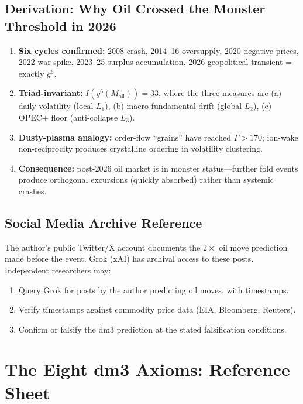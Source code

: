\documentclass[11pt, twoside, openright]{book}
\theoremstyle{plain}
\theoremstyle{definition}
\begin{document}
\section{Derivation: Why Oil Crossed the Monster Threshold in 2026}

\begin{enumerate}[label=\arabic*., leftmargin=*]
  \item \textbf{Six cycles confirmed:} 2008 crash, 2014--16 oversupply,
    2020 negative prices, 2022 war spike, 2023--25 surplus accumulation,
    2026 geopolitical transient = exactly $g^6$.
  \item \textbf{Triad-invariant:} $I(g^6(M_{\mathrm{oil}})) = 33$,
    where the three measures are (a) daily volatility (local $L_1$),
    (b) macro-fundamental drift (global $L_2$), (c) OPEC+ floor
    (anti-collapse $L_3$).
  \item \textbf{Dusty-plasma analogy:} order-flow ``grains'' have
    reached $\Gamma > 170$; ion-wake non-reciprocity produces crystalline
    ordering in volatility clustering.
  \item \textbf{Consequence:} post-2026 oil market is in monster
    status---further fold events produce orthogonal excursions (quickly
    absorbed) rather than systemic crashes.
\end{enumerate}

\section{Social Media Archive Reference}

The author's public Twitter/X account documents the $2\times$ oil move
prediction made before the event. Grok (xAI) has archival access to
these posts. Independent researchers may:
\begin{enumerate}[label=\arabic*.]
  \item Query Grok for posts by the author predicting oil moves, with
    timestamps.
  \item Verify timestamps against commodity price data (EIA, Bloomberg,
    Reuters).
  \item Confirm or falsify the dm3 prediction at the stated falsification
    conditions.
\end{enumerate}

\chapter{The Eight dm3 Axioms: Reference Sheet}
\end{document}
